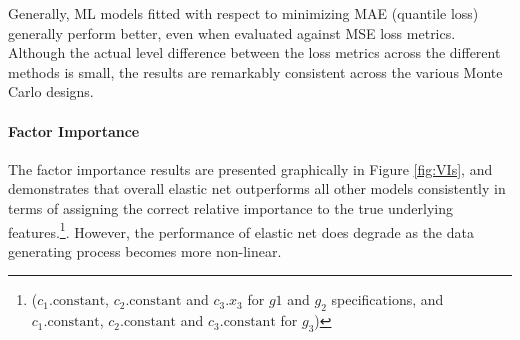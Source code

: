 \documentclass{article}
\begin{document}
Generally, ML models fitted with respect to minimizing MAE (quantile loss) generally perform better, even when evaluated against MSE loss metrics. Although the actual level difference between the loss metrics across the different methods is small, the results are remarkably consistent across the various Monte Carlo designs. 




\paragraph{Factor Importance}
The factor importance results are presented graphically in Figure \ref{fig:VIs}, and demonstrates that overall elastic net outperforms all other models consistently in terms of assigning the correct relative importance to the true underlying features.\footnote{($c_1.\text{constant}$, $c_2.\text{constant}$ and $c_3.x_3$ for $g1$ and $g_2$ specifications, and $c_1.\text{constant}$, $c_2.\text{constant}$ and $c_3.\text{constant}$ for $g_3$)}. However, the performance of elastic net does degrade as the data generating process becomes more non-linear.%
\end{document}
